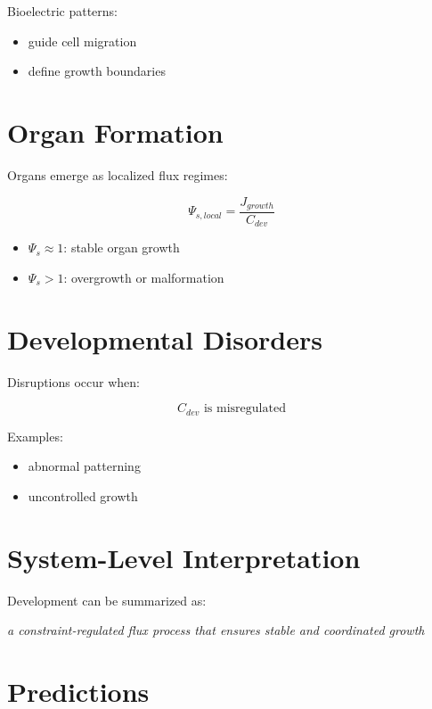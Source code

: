 \documentclass[11pt]{article}
\begin{document}
Bioelectric patterns:

\begin{itemize}
    \item guide cell migration
    \item define growth boundaries
\end{itemize}

\section{Organ Formation}

Organs emerge as localized flux regimes:

\begin{equation}
\Psi_{s,local} = \frac{J_{growth}}{C_{dev}}
\end{equation}

\begin{itemize}
    \item $\Psi_s \approx 1$: stable organ growth
    \item $\Psi_s > 1$: overgrowth or malformation
\end{itemize}

\section{Developmental Disorders}

Disruptions occur when:

\begin{equation}
C_{dev} \text{ is misregulated}
\end{equation}

Examples:

\begin{itemize}
    \item abnormal patterning
    \item uncontrolled growth
\end{itemize}

\section{System-Level Interpretation}

Development can be summarized as:

\begin{center}
\textit{a constraint-regulated flux process that ensures stable and coordinated growth}
\end{center}

\section{Predictions}
\end{document}
